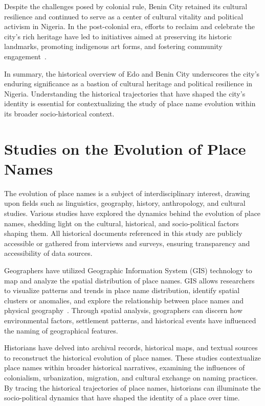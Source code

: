 Despite the challenges posed by colonial rule, Benin City retained its cultural resilience and continued to serve as a center of cultural vitality and political activism in Nigeria. In the post-colonial era, efforts to reclaim and celebrate the city's rich heritage have led to initiatives aimed at preserving its historic landmarks, promoting indigenous art forms, and fostering community engagement~\cite{falola2008history}.

In summary, the historical overview of Edo and Benin City underscores the city's enduring significance as a bastion of cultural heritage and political resilience in Nigeria. Understanding the historical trajectories that have shaped the city's identity is essential for contextualizing the study of place name evolution within its broader socio-historical context.

\section{Studies on the Evolution of Place Names}
The evolution of place names is a subject of interdisciplinary interest, drawing upon fields such as linguistics, geography, history, anthropology, and cultural studies. Various studies have explored the dynamics behind the evolution of place names, shedding light on the cultural, historical, and socio-political factors shaping them. All historical documents referenced in this study are publicly accessible or gathered from interviews and surveys, ensuring transparency and accessibility of data sources.

Geographers have utilized Geographic Information System (GIS) technology to map and analyze the spatial distribution of place names. GIS allows researchers to visualize patterns and trends in place name distribution, identify spatial clusters or anomalies, and explore the relationship between place names and physical geography~\cite{Bolstad}. Through spatial analysis, geographers can discern how environmental factors, settlement patterns, and historical events have influenced the naming of geographical features.

Historians have delved into archival records, historical maps, and textual sources to reconstruct the historical evolution of place names. These studies contextualize place names within broader historical narratives, examining the influences of colonialism, urbanization, migration, and cultural exchange on naming practices. By tracing the historical trajectories of place names, historians can illuminate the socio-political dynamics that have shaped the identity of a place over time.

